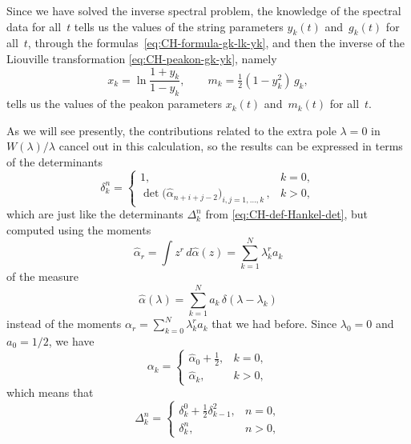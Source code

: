 \documentclass[10pt,a4paper]{article} \pdfoutput=1 
\begin{document}
Since we have solved the inverse spectral problem,
the knowledge of the spectral data for all~$t$
tells us the values of the string parameters $y_k(t)$ and~$g_k(t)$ for all~$t$,
through the formulas~\eqref{eq:CH-formula-gk-lk-yk},
and then the inverse of the Liouville transformation \eqref{eq:CH-peakon-gk-yk},
namely
\begin{equation}
  \label{eq:CH-inverse-liouville-trf}
  x_k = \ln\frac{1+y_k}{1-y_k},
  \qquad
  m_k = \tfrac12 (1-y_k^2) \, g_k
  ,
\end{equation}
tells us the values of the peakon parameters $x_k(t)$ and~$m_k(t)$ for all~$t$.

As we will see presently, the contributions related to the extra pole $\lambda=0$ in $W(\lambda)/\lambda$
cancel out in this calculation, so the results can be expressed in terms of the determinants
\begin{equation}
  \label{eq:CH-def-other-Hankel-det}
  \delta_k^n =
  \begin{cases}
    1
    , & k=0
    ,\\
    \det \bigl( \hat\alpha_{n+i+j-2} \bigr)_{i,j=1,\dots,k}
    \, , & k>0
    ,
  \end{cases}
\end{equation}
which are just like the determinants $\Delta_k^n$ from \eqref{eq:CH-def-Hankel-det},
but computed using the moments
\begin{equation}
  \hat\alpha_r = \int z^r \, d\hat\alpha(z) = \sum_{k=1}^N \lambda_k^r a_k
\end{equation}
of the measure
\begin{equation}
  \hat\alpha(\lambda) = \sum_{k=1}^N a_k \, \delta(\lambda - \lambda_k)
\end{equation}
instead of the moments $\alpha_r = \sum_{k=0}^N \lambda_k^r a_k$ that we had before.
Since $\lambda_0=0$ and $a_0=1/2$,
we have
\begin{equation*}
  \alpha_k =
  \begin{cases}
    \hat\alpha_0 + \tfrac12
    ,&
    k = 0
    ,\\
    \hat\alpha_k
    ,&
    k > 0
    ,
  \end{cases}
\end{equation*}
which means that
\begin{equation*}
  \Delta_k^n =
  \begin{cases}
    \delta_k^0 + \tfrac12 \delta_{k-1}^2
    ,&
    n = 0
    ,\\
    \delta_k^n
    ,&
    n > 0
    ,
  \end{cases}
\end{equation*}
\end{document}
